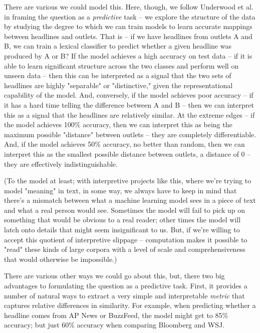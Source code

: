 \documentclass{scrartcl}
\begin{document}
There are various we could model this. Here, though, we follow Underwood et al.\cite{underwood2018transformation}\cite{underwood2018historical} in framing the question as a \textit{predictive} task -- we explore the structure of the data by studying the degree to which we can train models to learn accurate mappings between headlines and outlets. That is -- if we have headlines from outlets A and B, we can train a lexical classifier to predict whether a given headline was produced by A or B? If the model achieves a high accuracy on test data -- if it is able to learn significant structure across the two classes and perform well on unseen data -- then this can be interpreted as a signal that the two sets of headlines are highly "separable" or "distinctive," given the representational capability of the model. And, conversely, if the model achieves poor accuracy -- if it has a hard time telling the difference between A and B -- then we can interpret this as a signal that the headlines are relatively similar. At the extreme edges -- if the model achieves 100\% accuracy, then we can interpret this as being the maximum possible "distance" between outlets -- they are completely differentiable. And, if the model achieves 50\% accuracy, no better than random, then we can interpret this as the smallest possible distance between outlets, a distance of 0 -- they are effectively indistinguishable.

(To the model at least; with interpretive projects like this, where we're trying to model "meaning" in text, in some way, we always have to keep in mind that there's a mismatch between what a machine learning model sees in a piece of text and what a real person would see. Sometimes the model will fail to pick up on something that would be obvious to a real reader; other times the model will latch onto details that might seem insignificant to us. But, if we're willing to accept this quotient of interpretive slippage -- computation makes it possible to "read" these kinds of large corpora with a level of scale and comprehensiveness that would otherwise be impossible.)

There are various other ways we could go about this, but, there two big advantages to formulating the question as a predictive task. First, it provides a number of natural ways to extract a very simple and interpretable \textit{metric} that captures relative differences in similarity. For example, when predicting whether a headline comes from AP News or BuzzFeed, the model might get to 85\% accuracy; but just 60\% accuracy when comparing Bloomberg and WSJ.
\end{document}
